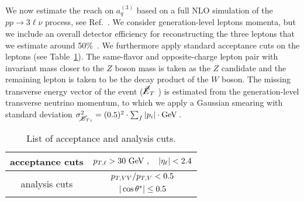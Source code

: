 We now estimate the reach on $a_q^{(3)}$ based on a full NLO simulation of the $pp \to 3\ell\nu$ process, see Ref.~\cite{Franceschini:2017ab}. %
We consider generation-level leptons momenta, but we include an overall detector efficiency for reconstructing the three leptons that we estimate around 50\%~\cite{ATLAS:2016iqc}. We furthermore apply standard acceptance cuts on the leptons (see Table~\ref{tab:cuts}).
The same-flavor and opposite-charge lepton pair with invariant mass closer to the $Z$ boson mass is taken as the $Z$ candidate and the remaining lepton  is taken to be the decay product of the $W$ boson. The missing transverse energy vector of the event ($\cancel{\vec{E}}_T$ ) is estimated from the generation-level transverse neutrino momentum, to which we apply a Gaussian smearing with standard deviation
$ \sigma_{{\met}_{i}}^2 = (0.5)^2 \cdot \sum_f |p_i| \cdot {\rm{GeV}}\,$.

\begin{table}
\centering
\begin{tabular}{c|c}
acceptance cuts &
$p_{T,\ell}>30 ~\text{GeV} \ ,\quad |\eta_{\ell}|<2.4$\\
\hline
\multirow{2}{*}{analysis cuts} &
$\deltapt/p_{T,V}<%
0.5$\\
& $|\cos \thetastar| \leq %
0.5$
\end{tabular}
\caption{List of acceptance and analysis cuts.}\label{tab:cuts}
\end{table}


